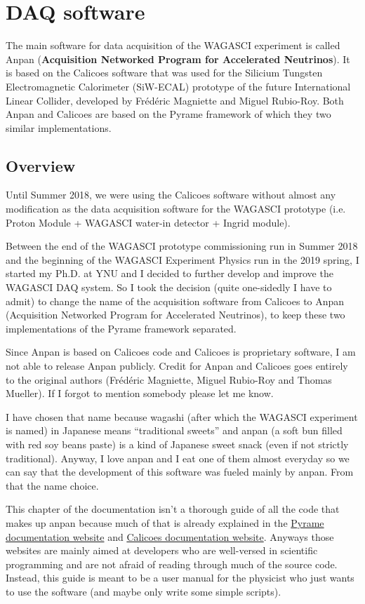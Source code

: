 \chapter{DAQ software}
The main software for data acquisition of the WAGASCI experiment is called Anpan
(\textbf{Acquisition Networked Program for Accelerated Neutrinos}). It is based
on the Calicoes software that was used for the Silicium Tungsten Electromagnetic
Calorimeter (SiW-ECAL) prototype of the future International Linear Collider,
developed by Frédéric Magniette and Miguel Rubio-Roy. Both Anpan and Calicoes
are based on the Pyrame framework of which they two similar implementations.

\section{Overview}
Until Summer 2018, we were using the Calicoes software without almost any
modification as the data acquisition software for the WAGASCI prototype
(i.e. Proton Module + WAGASCI water-in detector + Ingrid module).

Between the end of the WAGASCI prototype commissioning run in Summer 2018 and
the beginning of the WAGASCI Experiment Physics run in the 2019 spring, I
started my Ph.D. at YNU and I decided to further develop and improve the WAGASCI
DAQ system. So I took the decision (quite one-sidedly I have to admit) to change
the name of the acquisition software from Calicoes to Anpan (Acquisition
Networked Program for Accelerated Neutrinos), to keep these two implementations
of the Pyrame framework separated.

Since Anpan is based on Calicoes code and Calicoes is proprietary software, I am
not able to release Anpan publicly. Credit for Anpan and Calicoes goes entirely
to the original authors (Frédéric Magniette, Miguel Rubio-Roy and Thomas
Mueller). If I forgot to mention somebody please let me know.

I have chosen that name because wagashi (after which the WAGASCI experiment is
named) in Japanese means ``traditional sweets'' and anpan (a soft bun filled
with red soy beans paste) is a kind of Japanese sweet snack (even if not
strictly traditional). Anyway, I love anpan and I eat one of them almost
everyday so we can say that the development of this software was fueled mainly
by anpan. From that the name choice.

This chapter of the documentation isn't a thorough guide of all the code that
makes up anpan because much of that is already explained in the
\href{http://llr.in2p3.fr/sites/pyrame/documentation/}{Pyrame documentation
  website} and
\href{http://llr.in2p3.fr/sites/pyrame/calicoes/documentation/}{Calicoes
  documentation website}. Anyways those websites are mainly aimed at developers
who are well-versed in scientific programming and are not afraid of reading
through much of the source code. Instead, this guide is meant to be a user
manual for the physicist who just wants to use the software (and maybe only
write some simple scripts).

